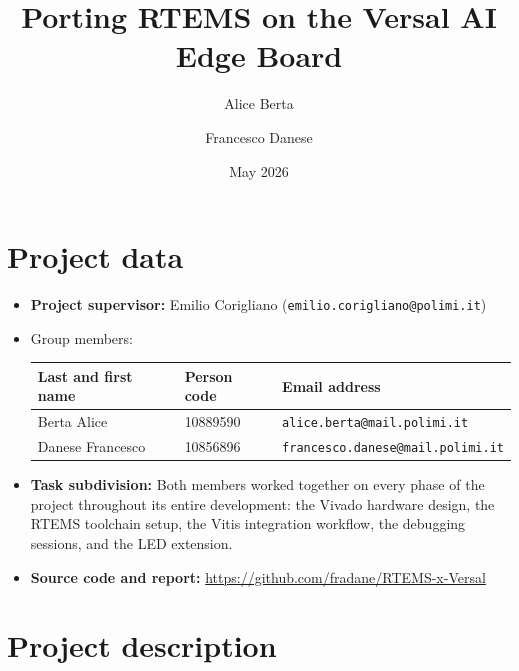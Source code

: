 \documentclass[10pt,a4]{article}
\author{Alice Berta \and Francesco Danese}
\date{May 2026}
\title{Porting RTEMS on the Versal AI Edge Board}
\begin{document}
\maketitle
\tableofcontents

\newpage

\section{Project data}

\begin{itemize}

\item
  \textbf{Project supervisor:} Emilio Corigliano
  (\texttt{emilio.corigliano@polimi.it})

\item
  Group members:

\begin{center}
\begin{tabular}{lll}
Last and first name & Person code & Email address\\
\hline
Berta Alice      & 10889590 & \texttt{alice.berta@mail.polimi.it} \\
Danese Francesco & 10856896 & \texttt{francesco.danese@mail.polimi.it} \\
\end{tabular}
\end{center}

\item
  \textbf{Task subdivision:} Both members worked together on every phase of
  the project throughout its entire development: the Vivado hardware design,
  the RTEMS toolchain setup, the Vitis integration workflow, the debugging
  sessions, and the LED extension.

\item
  \textbf{Source code and report:} \hypertarget{github}{\url{https://github.com/fradane/RTEMS-x-Versal}}

\end{itemize}


\section{Project description}
\end{document}
